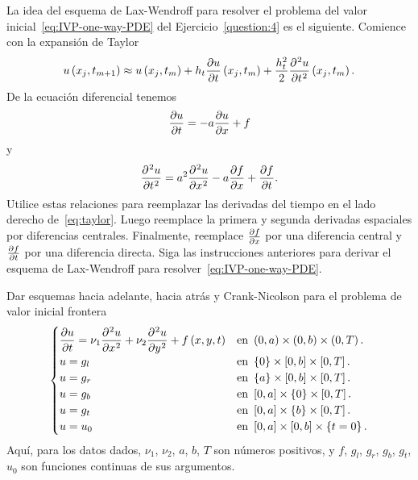 \begin{questions}
	\question

	La idea del esquema de Lax-Wendroff para resolver el problema del
	valor inicial~\eqref{eq:IVP-one-way-PDE} del
	Ejercicio~\ref{question:4} es el siguiente.
	Comience con la expansión de Taylor
	\begin{equation}\label{eq:taylor}
		u\left(x_{j},t_{m+1}\right)\approx
		u\left(x_{j},t_{m}\right)+
		h_{t}\diffp{u}{t}\left(x_{j},t_{m}\right)+
		\frac{h^{2}_{t}}{2}
		\diffp[2]{u}{t}\left(x_{j},t_{m}\right).
	\end{equation}
	De la ecuación diferencial tenemos
	\begin{equation*}
		\diffp{u}{t}=
		-a\diffp{u}{x}+
		f
	\end{equation*}
	y
	\begin{equation*}
		\diffp[2]{u}{t}=
		a^{2}\diffp[2]{u}{x}-
		a\diffp{f}{x}+
		\diffp{f}{t}.
	\end{equation*}
	Utilice estas relaciones para reemplazar las derivadas del tiempo
	en el lado derecho de~\eqref{eq:taylor}.
	Luego reemplace la primera y segunda derivadas espaciales por
	diferencias centrales.
	Finalmente, reemplace $\diffp{f}{x}$ por una diferencia central y
	$\diffp{f}{t}$ por una diferencia directa.
	Siga las instrucciones anteriores para derivar el esquema de
	Lax-Wendroff para resolver~\eqref{eq:IVP-one-way-PDE}.

	\question

	Dar esquemas hacia adelante, hacia atrás y Crank-Nicolson para el problema de valor inicial frontera
	\begin{equation*}
		\begin{cases}\displaystyle
			\diffp{u}{t}=
			\nu_{1}\diffp[2]{u}{x}+
			\nu_{2}\diffp[2]{u}{y}+
			f\left(x,y,t\right) &
			\text{en }\left(0,a\right)\times\left(0,b\right)\times\left(0,T\right). \\
			u=g_{l}             &
			\text{en }\left\{0\right\}\times\left[0,b\right]\times\left[0,T\right]. \\
			u=g_{r}             &
			\text{en }\left\{a\right\}\times\left[0,b\right]\times\left[0,T\right]. \\
			u=g_{b}             &
			\text{en }\left[0,a\right]\times\left\{0\right\}\times\left[0,T\right]. \\
			u=g_{t}             &
			\text{en }\left[0,a\right]\times\left\{b\right\}\times\left[0,T\right]. \\
			u=u_{0}             &
			\text{en }\left[0,a\right]\times\left[0,b\right]\times\left\{t=0\right\}.
		\end{cases}
	\end{equation*}
	Aquí, para los datos dados, $\nu_{1}$, $\nu_{2}$, $a$, $b$, $T$ son
	números positivos, y $f$, $g_{l}$, $g_{r}$, $g_{b}$, $g_{t}$,
	$u_{0}$ son funciones continuas de sus argumentos.


\end{questions}
